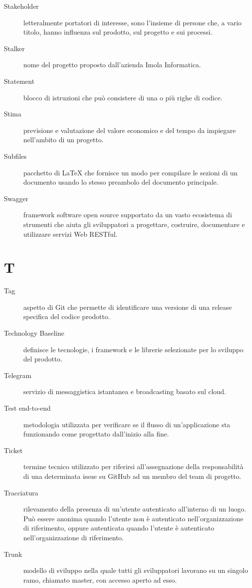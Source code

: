 \documentclass{article}
\begin{document}
\begin{description}
  \item[Stakeholder] letteralmente portatori di interesse, sono l'insieme di persone che, a vario titolo, hanno influenza sul prodotto, sul progetto e sui processi.
  \item[Stalker] nome del progetto proposto dall'azienda Imola Informatica.
  \item[Statement] blocco di istruzioni che può consistere di una o più righe di codice.
  \item[Stima] previsione e valutazione del valore economico e del tempo da impiegare nell'ambito di un progetto.
  \item[Subfiles] pacchetto di LaTeX che fornisce un modo per compilare le sezioni di un documento usando lo stesso preambolo del documento principale.
  \item[Swagger] framework software open source supportato da un vasto ecosistema di strumenti che aiuta gli sviluppatori a progettare, costruire, documentare e utilizzare servizi Web RESTful.
\end{description}
\newpage
\section{T}
\begin{description}
  \item[Tag] aspetto di Git che permette di identificare una versione di una release specifica del codice prodotto.
  \item[Technology Baseline] definisce le tecnologie, i framework e le librerie selezionate per lo sviluppo del prodotto.
  \item[Telegram] servizio di messaggistica istantanea e broadcasting basato sul cloud.
  \item[Test end-to-end] metodologia utilizzata per verificare se il flusso di un'applicazione sta funzionando come progettato dall'inizio alla fine.
  \item[Ticket] termine tecnico utilizzato per riferirsi all'assegnazione della responsabilità di una determinata issue su GitHub ad un membro del team di progetto.
  \item[Tracciatura] rilevamento della presenza di un'utente autenticato all'interno di un luogo. Può essere anonima quando l'utente non è autenticato nell'organizzazione di riferimento, oppure autenticata quando l'utente è autenticato nell'organizzazione di riferimento.
  \item[Trunk] modello di sviluppo nella quale tutti gli sviluppatori lavorano su un singolo ramo, chiamato master, con accesso aperto ad esso.
\end{description}
\newpage
\end{document}

